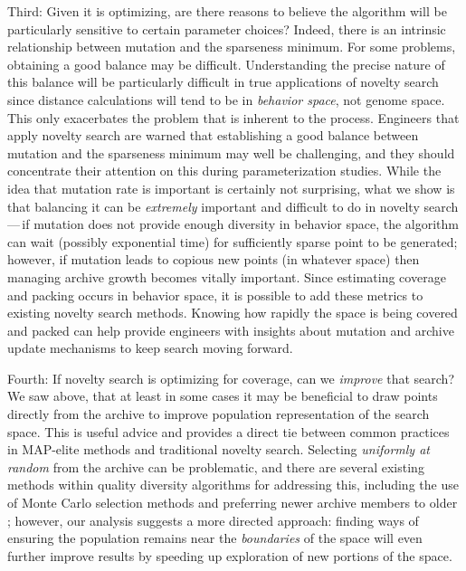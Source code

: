 \documentclass[twoside]{article}
\begin{document}
Third: Given it is optimizing, are there reasons to believe the algorithm will be particularly sensitive to certain parameter choices?  Indeed, there is an intrinsic relationship between mutation and the sparseness minimum.  For some problems, obtaining a good balance may be difficult.  Understanding the precise nature of this balance will be particularly difficult in true applications of novelty search since distance calculations will tend to be in \emph{behavior space}, not genome space.  This only exacerbates the problem that is inherent to the process.  Engineers that apply novelty search are warned that establishing a good balance between mutation and the sparseness minimum may well be challenging, and they should concentrate their attention on this during parameterization studies.  While the idea that mutation rate is important is certainly not surprising, what we show is that balancing it can be \emph{extremely} important and difficult to do in novelty search\,---\,if mutation does not provide enough diversity in behavior space, the algorithm can wait (possibly exponential time) for sufficiently sparse point to be generated; however, if mutation leads to copious new points (in whatever space) then managing archive growth becomes vitally important.  Since estimating coverage and packing occurs in behavior space, it is possible to add these metrics to existing novelty search methods.  Knowing how rapidly the space is being covered and packed can help provide engineers with insights about mutation and archive update mechanisms to keep search moving forward.

Fourth: If novelty search is optimizing for coverage, can we \emph{improve} that search?  We saw above, that at least in some cases it may be beneficial to draw points directly from the archive to improve population representation of the search space.  This is useful advice and provides a direct tie between common practices in MAP-elite methods and traditional novelty search.  Selecting \emph{uniformly at random} from the archive can be problematic, and there are several existing methods within quality diversity algorithms for addressing this, including the use of Monte Carlo selection methods \citep{Sfikas2021gecco} and preferring newer archive members to older \citep{ConinxDoncieux2021gecco}; however, our analysis suggests a more directed approach: finding ways of ensuring the population remains near the \emph{boundaries} of the space will even further improve results by speeding up exploration of new portions of the space. 
\end{document}
